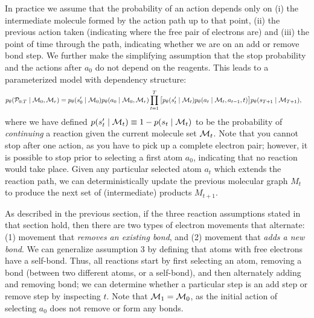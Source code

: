In practice we assume that the probability of an action depends only on (i) the intermediate molecule formed by the action path up to that point, (ii) the previous action taken (indicating where the free pair of electrons are) and (iii) the point of time through the path, indicating whether we are on an add or remove bond step. 
We further make the simplifying assumption that the stop probability and the actions after $a_0$ do not depend on the reagents. This leads to a parameterized model with dependency structure:
\begin{align}
p_\theta({\mathcal{P}}_{0:T} \mid {\mathcal{M}}_0, {\mathcal{M}}_r) 
&=
	   p_\theta(s'_0 \mid {\mathcal{M}}_0)
       p_\theta(a_0 \mid {\mathcal{M}}_0, {\mathcal{M}}_r)
\prod_{t=1}^{T}
	\big[ 
		p_\theta(s_{t}' \mid {\mathcal{M}}_{t})
		p_\theta(a_t \mid {\mathcal{M}}_{t}, a_{t-1}, t)
	\big]
	p_\theta(s_{T+1} \mid {\mathcal{M}}_{T+1})
	,
\label{eq:jointprob}
\end{align}
where we have defined $p(s'_t \mid {\mathcal{M}}_t) \equiv 1 - p(s_t \mid {\mathcal{M}}_t)$ to be the probability of {\em continuing} a reaction given the current molecule set ${\mathcal{M}}_t$.
%
%
%
Note that you cannot stop after one action, as you have to pick up a complete electron pair;
however, it is possible to stop prior to selecting a first atom $a_0$, indicating that no reaction would take place.
Given any particular selected atom $a_t$ which extends the reaction path, we can deterministically update the previous molecular graph $M_{t}$ to produce the next set of (intermediate) products $M_{t+1}$.

As described in the previous section, if the three reaction assumptions stated in that section hold, then there are two types of electron movements that alternate: 
(1) movement that \emph{removes an existing bond}, and 
(2) movement that \emph{adds a new bond}. 
We can generalize assumption 3 by defining that atoms with free electrons have a self-bond. 
Thus, all reactions start by first selecting an atom, removing a bond (between two different atoms, or a self-bond), and then alternately adding and removing bond;
we can determine whether a particular step is an add step or remove step by inspecting $t$.
Note that ${\mathcal{M}}_1 = {\mathcal{M}}_0$, as the initial action of selecting $a_0$ does not remove or form any bonds.

